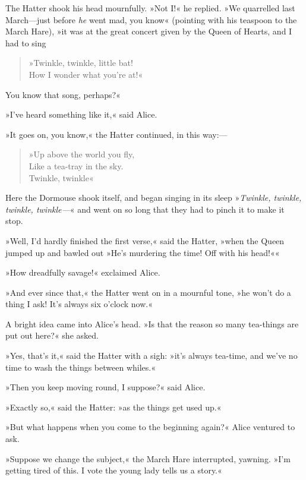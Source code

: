 The Hatter shook his head mournfully. »Not I\@!« he replied. »We quarrelled last March—just before \textit{he} went mad, you know\longdash« (pointing with his teaspoon to the March Hare), »it was at the great concert given by the Queen of Hearts, and I had to sing

\begin{verse}
»Twinkle, twinkle, little bat!\\
How I wonder what you're at!«
\end{verse}

You know that song, perhaps?«

»I've heard something like it,« said Alice.

»It goes on, you know,« the Hatter continued, in this way:—

\begin{verse}
»Up above the world you fly,\\
Like a tea-tray in the sky.\\
\hspace{1em}Twinkle, twinkle\longdash«
\end{verse}

Here the Dormouse shook itself, and began singing in its sleep »\textit{Twinkle, twinkle, twinkle, twinkle—}« and went on so long that they had to pinch it to make it stop.

»Well, I'd hardly finished the first verse,« said the Hatter, »when the Queen jumped up and bawled out »He's murdering the time! Off with his head!««

»How dreadfully savage!« exclaimed Alice.

»And ever since that,« the Hatter went on in a mournful tone, »he won't do a thing I ask! It's always six o'clock now.«

A bright idea came into Alice's head. »Is that the reason so many tea-things are put out here?« she asked.

»Yes, that's it,« said the Hatter with a sigh: »it's always tea-time, and we've no time to wash the things between whiles.«

»Then you keep moving round, I suppose?« said Alice.

»Exactly so,« said the Hatter: »as the things get used up.«

»But what happens when you come to the beginning again?« Alice ventured to ask.

»Suppose we change the subject,« the March Hare interrupted, yawning. »I'm getting tired of this. I vote the young lady tells us a story.«

